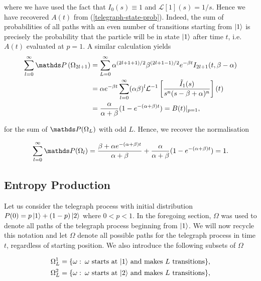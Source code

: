 where we have used the fact that $I_0(s) \equiv 1$ and $\mathcal{L}[1](s) = 1/s$. Hence we have recovered $A(t)$ from (\ref{telegraph-state-prob}). Indeed, the sum of probabilities of all paths with an even number of transitions starting from $\ket{1}$ is precisely the probability that the particle will be in state $\ket{1}$ after time $t$, i.e. $A(t)$ evaluated at $p=1$. A similar calculation yields
\begin{align}
\begin{split}\label{odd-normalisation}
\sum_{l=0}^\infty \bP\left(\Omega_{2l+1}\right) &= \sum_{L=0}^\infty \alpha^{(2l+1+1)/2}\beta^{(2l+1-1)/2}e^{-\beta t}I_{2l+1}(t,\beta - \alpha)\\ 
&= \alpha e^{-\beta t} \sum_{l = 0 }^\infty (\alpha\beta)^l\mathcal{L}^{-1}\left [ \frac {\tilde{I}_1(s)}{s^n(s-\beta +\alpha)^n}\right](t) \\ 
&= \frac{\alpha}{\alpha + \beta}(1-e^{-(\alpha +\beta)t}) = B(t)|_{p=1}, 
\end{split}
\end{align}

for the sum of $\bP(\Omega_L)$ with odd $L$. Hence, we recover the normalisation

\begin{align}
    \sum_{l = 0}^\infty \bP(\Omega_l)= \frac{\beta + \alpha e^{-(\alpha+\beta)t}}{\alpha + \beta} + \frac{\alpha}{\alpha + \beta}(1-e^{-(\alpha +\beta)t}) = 1.
\end{align}

\subsection{Entropy Production}

Let us consider the telegraph process with initial distribution $P(0) = p\ket{1} + (1-p)\ket{2}$ where $0 < p < 1$. In the foregoing section, $\Omega$ was used to denote all paths of the telegraph process beginning from $\ket{1}$. We will now recycle this notation and let $\Omega$ denote all possible paths for the telegraph process in time $t$, regardless of starting position. We also introduce the following subsets of $\Omega$ 

\begin{align}
    \begin{split}
    \Omega_L^1 = \{ \omega: \:\text{$\omega$ starts at $\ket{1}$ and makes $L$ transitions} \}, \\ 
    \Omega_L^2 = \{ \omega: \:\text{$\omega$ starts at $\ket{2}$ and makes $L$ transitions} \},
    \end{split}
\end{align}


